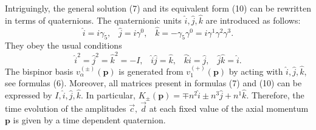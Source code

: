 \documentclass[12pt]{article}
\begin{document}
Intriguingly, the general solution (7)  and its equivalent form (10)  can be rewritten in terms of quaternions. 
The quaternionic units $\hat{i}, \hat{j}, \hat{k}$ are introduced as follows:
\[ \hat{i}= i \gamma_5, \;\;\;   \hat{j}= i \gamma^0, \;\;\;   \hat{k}= - \gamma_5 \gamma^0 = i \gamma^1 \gamma^2 \gamma^3.\]
They obey the usual conditions
\[ \hat{i}^2 = \hat{j}^2 = \hat{k}^2 = - I, \;\;\; \hat{i}\hat{j}=\hat{k}, \;\;\; \hat{k}\hat{i}=\hat{j}, \;\;\; \hat{j}\hat{k}=\hat{i}. \]
The bispinor basis $v^{(\pm)}_{\alpha}(\mathbf{p})$ is generated from $v^{(+)}_1(\mathbf{p})$ by acting with $\hat{i}, \hat{j}, \hat{k}$, see formulas (6).   Moreover, 
all matrices present in formulas (7) and (10) can be expressed by $I, \hat{i}, \hat{j}, \hat{k}$. In  particular,  $K_{\pm}(\mathbf{p}) =   \mp n^2 \hat{i} \pm n^3 \hat{j} +  n^1 \hat{k}$. Therefore,  the time evolution of the amplitudes $\vec{c}, \: \vec{d}$ at each fixed value of the axial momentum $\mathbf{p}$  is given by a time dependent quaternion.  
\end{document}
